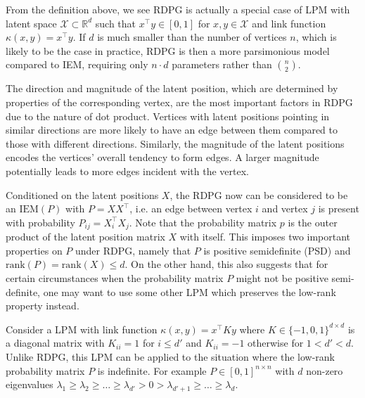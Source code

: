 From the definition above, we see RDPG is actually a special case of LPM with latent space $\mathcal{X} \subset \mathbb{R}^d$ such that $x^{\top} y \in [0, 1]$ for $x, y \in \mathcal{X}$ and link function $\kappa(x, y) = x^{\top} y$.
If $d$ is much smaller than the number of vertices $n$, which is likely to be the case in practice, RDPG is then a more parsimonious model compared to IEM, requiring only $n \cdot d$ parameters rather than $n \choose 2$.

The direction and magnitude of the latent position, which are determined by properties of the corresponding vertex, are the most important factors in RDPG due to the nature of dot product. Vertices with latent positions pointing in similar directions are more likely to have an edge between them compared to those with different directions. Similarly, the magnitude of the latent positions encodes the vertices' overall tendency to form edges. A larger magnitude potentially leads to more edges incident with the vertex.

Conditioned on the latent positions $X$, the RDPG now can be considered to be an $\mathrm{IEM}(P)$ with $P = X X^{\top}$, i.e. an edge between vertex $i$ and vertex $j$ is present with probability $P_{ij} = X_i^{\top} X_j$.
Note that the probability matrix $p$ is the outer product of the latent position matrix $X$ with itself. This imposes two important properties on $P$ under RDPG, namely that $P$ is positive semidefinite (PSD) and $\mathrm{rank}(P)=\mathrm{rank}(X)\leq d$. On the other hand, this also suggests that for certain circumstances when the probability matrix $P$ might not be positive semi-definite, one may want to use some other LPM which preserves the low-rank property instead.

\begin{example}
\label{example:LPM}
Consider a LPM with link function $\kappa(x, y) = x^{\top} K y$ where $K \in \{-1, 0, 1\}^{d \times d}$ is a diagonal matrix with $K_{ii} = 1$ for $i \le d'$ and $K_{ii} = -1$ otherwise for $1 < d' < d$.
Unlike RDPG, this LPM can be applied to the situation where the low-rank probability matrix $P$ is indefinite. For example $P \in [0, 1]^{n \times n}$ with $d$ non-zero eigenvalues $\lambda_1 \ge \lambda_2 \ge \dots \ge \lambda_{d'} > 0 > \lambda_{d'+1} \ge \dots \ge \lambda_d$.
\end{example}


